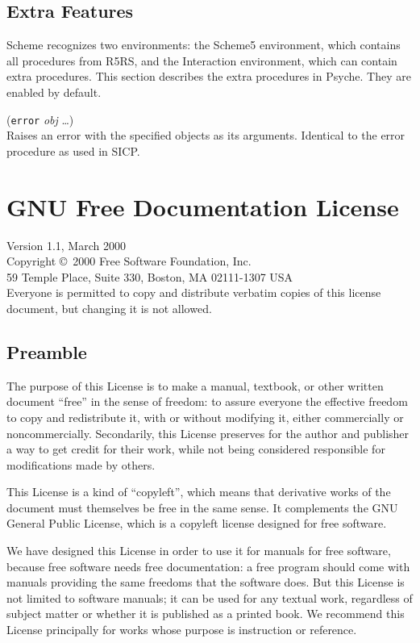 \documentclass{report}
\newcommand{\code}[1]{\texttt{#1}}
\begin{document}
\section{Extra Features}
Scheme recognizes two environments: the Scheme5 environment, which
contains all procedures from R5RS, and the Interaction environment,
which can contain extra procedures. This section describes the extra
procedures in Psyche. They are enabled by default. 

(\code{error} \emph{obj} \ldots) \\
Raises an error with the specified objects as its arguments. Identical
to the error procedure as used in SICP\cite{sicp}. 
    


%
%
\chapter{GNU Free Documentation License}
\label{chap.gfdl}

Version 1.1, March 2000\\

 Copyright \copyright\ 2000  Free Software Foundation, Inc.\\
     59 Temple Place, Suite 330, Boston, MA  02111-1307  USA\\
 Everyone is permitted to copy and distribute verbatim copies
 of this license document, but changing it is not allowed.

\section*{Preamble}

The purpose of this License is to make a manual, textbook, or other
written document ``free'' in the sense of freedom: to assure everyone
the effective freedom to copy and redistribute it, with or without
modifying it, either commercially or noncommercially.  Secondarily,
this License preserves for the author and publisher a way to get
credit for their work, while not being considered responsible for
modifications made by others.

This License is a kind of ``copyleft'', which means that derivative
works of the document must themselves be free in the same sense.  It
complements the GNU General Public License, which is a copyleft
license designed for free software.

We have designed this License in order to use it for manuals for free
software, because free software needs free documentation: a free
program should come with manuals providing the same freedoms that the
software does.  But this License is not limited to software manuals;
it can be used for any textual work, regardless of subject matter or
whether it is published as a printed book.  We recommend this License
principally for works whose purpose is instruction or reference.
\end{document}
